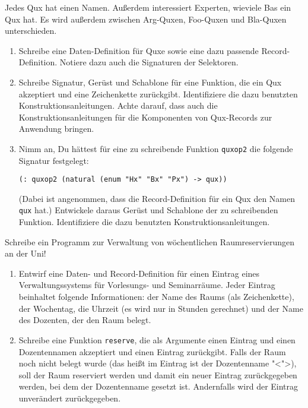 \begin{aufgabe}

  Jedes Qux hat einen Namen.  Außerdem interessiert
  Experten, wieviele Bas ein Qux hat.  Es wird außerdem zwischen
  Arg-Quxen, Foo-Quxen und Bla-Quxen unterschieden.
  \begin{enumerate}
  \item Schreibe eine Daten-Definition für Quxe sowie eine dazu
    passende Record-Definition. Notiere dazu auch die Signaturen der
    Selektoren.
  \item Schreibe Signatur, Gerüst und Schablone für eine Funktion,
    die ein Qux akzeptiert und eine Zeichenkette zurückgibt.
    Identifiziere die dazu benutzten Konstruktionsanleitungen.
    Achte darauf, dass auch die Konstruktionsanleitungen für die
    Komponenten von Qux-Records zur Anwendung bringen.
  \item Nimm an, Du hättest für eine zu schreibende Funktion
    \lstinline{quxop2} die folgende Signatur festgelegt:
\begin{lstlisting}
(: quxop2 (natural (enum "Hx" "Bx" "Px") -> qux))
\end{lstlisting}
    (Dabei ist angenommen, dass die Record-Definition für ein Qux
    den Namen \lstinline{qux} hat.) Entwickele daraus Gerüst und
    Schablone der zu schreibenden Funktion.  Identifiziere die dazu
    benutzten Konstruktionsanleitungen.
  \end{enumerate}

\end{aufgabe}

\begin{aufgabe}

  Schreibe ein Programm zur Verwaltung von wöchentlichen
  Raumreservierungen an der Uni!

  \begin{enumerate}
  \item Entwirf eine Daten- und Record-Definition für einen Eintrag eines
    Verwaltungssystems für Vorlesungs- und Seminarräume. Jeder Eintrag beinhaltet
    folgende Informationen: der Name des Raums (als Zeichenkette), der Wochentag,
    die Uhrzeit (es wird nur in Stunden gerechnet) und der Name des Dozenten, der
    den Raum belegt.

  \item Schreibe eine Funktion \lstinline{reserve}, die als Argumente einen Eintrag und einen
    Dozentennamen akzeptiert und einen Eintrag zurückgibt. Falls der Raum noch nicht belegt
    wurde (das heißt im Eintrag ist der Dozentenname "<">), soll der Raum reserviert werden und
    damit ein neuer Eintrag zurückgegeben werden, bei dem der Dozentenname gesetzt ist.
    Andernfalls wird der Eintrag unverändert zurückgegeben.
  \end{enumerate}
\end{aufgabe}


